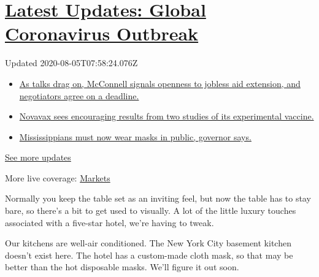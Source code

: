 \hypertarget{latest-updates-global-coronavirus-outbreak}{%
\section{\texorpdfstring{\href{https://www.nytimes.com/2020/08/04/world/coronavirus-cases.html?action=click\&pgtype=Article\&state=default\&region=MAIN_CONTENT_1\&context=storylines_live_updates}{Latest
Updates: Global Coronavirus
Outbreak}}{Latest Updates: Global Coronavirus Outbreak}}\label{latest-updates-global-coronavirus-outbreak}}

Updated 2020-08-05T07:58:24.076Z

\begin{itemize}
\tightlist
\item
  \href{https://www.nytimes.com/2020/08/04/world/coronavirus-cases.html?action=click\&pgtype=Article\&state=default\&region=MAIN_CONTENT_1\&context=storylines_live_updates\#link-762df92}{As
  talks drag on, McConnell signals openness to jobless aid extension,
  and negotiators agree on a deadline.}
\item
  \href{https://www.nytimes.com/2020/08/04/world/coronavirus-cases.html?action=click\&pgtype=Article\&state=default\&region=MAIN_CONTENT_1\&context=storylines_live_updates\#link-1228a480}{Novavax
  sees encouraging results from two studies of its experimental
  vaccine.}
\item
  \href{https://www.nytimes.com/2020/08/04/world/coronavirus-cases.html?action=click\&pgtype=Article\&state=default\&region=MAIN_CONTENT_1\&context=storylines_live_updates\#link-794484ed}{Mississippians
  must now wear masks in public, governor says.}
\end{itemize}

\href{https://www.nytimes.com/2020/08/04/world/coronavirus-cases.html?action=click\&pgtype=Article\&state=default\&region=MAIN_CONTENT_1\&context=storylines_live_updates}{See
more updates}

More live coverage:
\href{https://www.nytimes.com/live/2020/08/04/business/stock-market-today-coronavirus?action=click\&pgtype=Article\&state=default\&region=MAIN_CONTENT_1\&context=storylines_live_updates}{Markets}

Normally you keep the table set as an inviting feel, but now the table
has to stay bare, so there's a bit to get used to visually. A lot of the
little luxury touches associated with a five-star hotel, we're having to
tweak.

Our kitchens are well-air conditioned. The New York City basement
kitchen doesn't exist here. The hotel has a custom-made cloth mask, so
that may be better than the hot disposable masks. We'll figure it out
soon.

